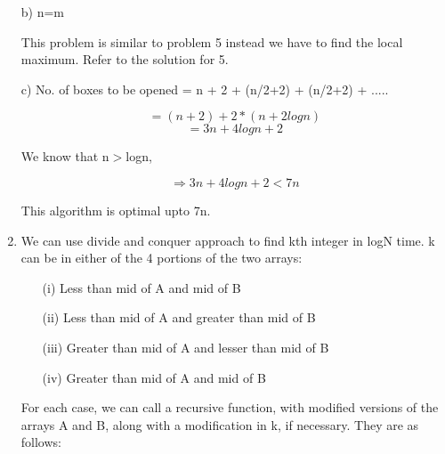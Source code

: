 \documentclass[12pt]{article}
\begin{document}
\begin{enumerate}
    b) n=m
    
    This problem is similar to problem 5 instead we have to find the local maximum. Refer to the solution for 5.
    
    c) No. of boxes to be opened = n + 2 + (n/2+2) + (n/2+2) + .....
    
    \[ = (n+2) + 2*(n+2logn) \]
    \[ = 3n + 4logn + 2\]
    
    We know that n$>$logn,
    
    \[ \Rightarrow 3n + 4logn + 2 < 7n \]
    
    This algorithm is optimal upto 7n.    
    \item
    We can use divide and conquer approach to find kth integer in logN time. k can be in either of the 4 portions of the two arrays:
    \begin{enumerate}
        \item[(i)] Less than mid of A and mid of B
        \item[(ii)] Less than mid of A and greater than mid of B
        \item[(iii)] Greater than mid of A and lesser than mid of B
        \item[(iv)] Greater than mid of A and mid of B
    \end{enumerate}
    For each case, we can call a recursive function, with modified versions of the arrays A and B, along with a modification in k, if necessary. They are as follows:
    

\end{enumerate}
\end{document}
